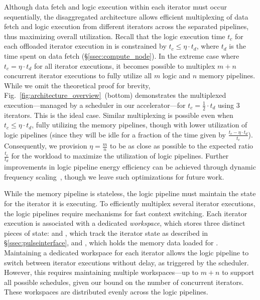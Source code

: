Although data fetch and logic execution within each iterator must occur sequentially, the disaggregated architecture allows efficient multiplexing of data fetch and logic execution from different iterators across the separated pipelines, thus maximizing overall utilization. Recall that the logic execution time $t_c$ for each offloaded iterator execution in \pulse is constrained by $t_c \leq \eta \cdot t_d$, where $t_d$ is the time spent on data fetch (\S\ref{ssec:compute_node}). In the extreme case where $t_c = \eta \cdot t_d$ for all iterator executions, it becomes possible to multiplex $m+n$ concurrent iterator executions to fully utilize all $m$ logic and $n$ memory pipelines. While we omit the theoretical proof for brevity, Fig.~\ref{fig:architecture_overview}~(bottom) demonstrates the multiplexed execution—managed by a scheduler in our accelerator—for $t_c = \frac{1}{2} \cdot t_d$ using 3 iterators. This is the ideal case. Similar multiplexing is possible even when $t_c \leq \eta \cdot t_d$, fully utilizing the memory pipelines, though with lower utilization of logic pipelines (since they will be idle for a fraction of the time given by $\frac{t_c - \eta \cdot t_d}{t_c}$). Consequently, we provision $\eta = \frac{m}{n}$ to be as close as possible to the expected ratio $\frac{t_c}{t_d}$ for the workload to maximize the utilization of logic pipelines. Further improvements in logic pipeline energy efficiency can be achieved through dynamic frequency scaling~\cite{daepowerscaling}, though we leave such optimizations for future work.

While the memory pipeline is stateless, the logic pipeline must maintain the state for the iterator it is executing. To efficiently multiplex several iterator executions, the logic pipelines require mechanisms for fast context switching. Each iterator execution is associated with a dedicated \emph{workspace}, which stores three distinct pieces of state:  and , which track the iterator state as described in \S\ref{ssec:pulseinterface}, and , which holds the memory data loaded for . Maintaining a dedicated workspace for each iterator allows the logic pipeline to switch between iterator executions without delay, as triggered by the scheduler. However, this requires maintaining multiple workspaces—up to $m+n$ to support all possible schedules, given our bound on the number of concurrent iterators. These workspaces are distributed evenly across the logic pipelines.



